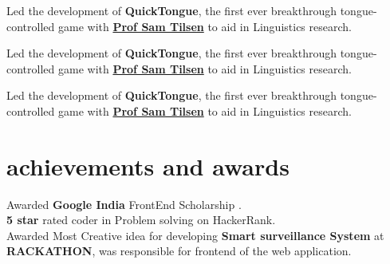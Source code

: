 \documentclass[]{deedy-resume-openfont}
\begin{document}
\begin{minipage}[t]{0.66\textwidth}
Led the development of \textbf{QuickTongue}, the first ever breakthrough tongue-controlled game with \textbf{\href{http://conf.ling.cornell.edu/~tilsen/}{Prof Sam Tilsen}} to aid in Linguistics research. 
\sectionsep

Led the development of \textbf{QuickTongue}, the first ever breakthrough tongue-controlled game with \textbf{\href{http://conf.ling.cornell.edu/~tilsen/}{Prof Sam Tilsen}} to aid in Linguistics research. 
\sectionsep

Led the development of \textbf{QuickTongue}, the first ever breakthrough tongue-controlled game with \textbf{\href{http://conf.ling.cornell.edu/~tilsen/}{Prof Sam Tilsen}} to aid in Linguistics research. 
\sectionsep


\section{achievements and awards} 
\textbullet{} Awarded \textbf{Google India }  FrontEnd Scholarship .\\
\textbullet{} \textbf{5 star } rated coder in Problem solving on HackerRank.\\
\textbullet{} Awarded Most Creative idea for developing \textbf{Smart surveillance System } at \textbf{RACKATHON}, was responsible for  frontend of the web application.\\

\sectionsep

\end{minipage} 
\end{document}

